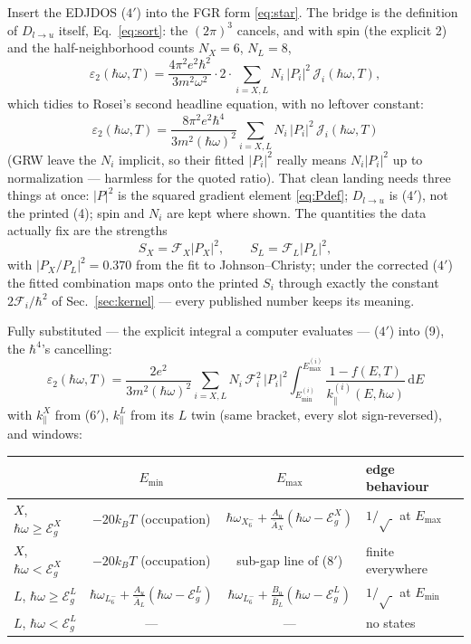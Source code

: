 \documentclass[11pt,a4paper]{article}
\numberwithin{equation}{section}
\newcommand{\hw}{\hbar\omega}
\newcommand{\EgX}{\mathcal{E}_g^{X}}
\newcommand{\EgL}{\mathcal{E}_g^{L}}
\newcommand{\cF}{\mathcal{F}}
\newcommand{\cJ}{\mathcal{J}}
\newcommand{\Ab}{\bar{A}}
\newcommand{\Bb}{\bar{B}}
\newcommand{\kpar}{k_{\parallel}}
\newcommand{\eps}{\varepsilon}
\newcommand{\dd}{\mathrm{d}}
\newcommand{\Dlu}{D_{l\to u}}
\newcommand{\wXu}{\hbar\omega_{X_6^-}}
\newcommand{\wLu}{\hbar\omega_{L_6^-}}
\newcommand{\fFD}{f}
\newcommand{\kB}{k_B}
\begin{document}
Insert the EDJDOS ($4'$) into the FGR form \eqref{eq:star}.  The
bridge is the definition of $\Dlu$ itself, Eq.~\eqref{eq:sort}: the
$(2\pi)^3$ cancels, and with spin (the explicit 2) and the
half-neighborhood counts $N_X=6$, $N_L=8$,
\begin{equation}
\eps_2(\hw,T)=\frac{4\pi^2e^2\hbar^2}{3m^2\omega^2}\cdot2\cdot
\sum_{i=X,L}N_i\,|P_i|^2\,\cJ_i(\hw,T),
\end{equation}
which tidies to Rosei's second headline equation, with no leftover
constant:
\begin{equation}
\boxed{\;
\eps_2(\hw,T)=\frac{8\pi^2e^2\hbar^4}{3m^2(\hw)^2}
\sum_{i=X,L}N_i\,|P_i|^2\,\cJ_i(\hw,T)
\;}
\tag{9}
\label{eq:eps9}
\end{equation}
(GRW leave the $N_i$ implicit, so their fitted $|P_i|^2$ really means
$N_i|P_i|^2$ up to normalization --- harmless for the quoted ratio).
That clean landing needs three things at once: $|P|^2$ is the squared
gradient element \eqref{eq:Pdef}; $\Dlu$ is ($4'$), not the printed
(4); spin and $N_i$ are kept where shown.  The quantities the data
actually fix are the strengths
\begin{equation}
S_X=\cF_X|P_X|^2,\qquad S_L=\cF_L|P_L|^2,
\tag{10}
\label{eq:S10}
\end{equation}
with $|P_X/P_L|^2=0.370$ from the fit to Johnson--Christy; under the
corrected ($4'$) the fitted combination maps onto the printed $S_i$
through exactly the constant $2\cF_i/\hbar^2$ of
Sec.~\ref{sec:kernel} --- every published number keeps its meaning.

Fully substituted --- the explicit integral a computer evaluates ---
($4'$) into (9), the $\hbar^4$'s cancelling:
\begin{equation}
\boxed{\;
\eps_2(\hw,T)=\frac{2e^{2}}{3m^{2}(\hw)^{2}}
\sum_{i=X,L}N_i\,\cF_i^{2}\,|P_i|^{2}
\int_{E_{\min}^{(i)}}^{E_{\max}^{(i)}}
\frac{1-\fFD(E,T)}{\kpar^{(i)}(E,\hw)}\,\dd E
\;}
\tag{11}
\label{eq:eps11}
\end{equation}
with $\kpar^{X}$ from ($6'$), $\kpar^{L}$ from its $L$ twin (same
bracket, every slot sign-reversed), and windows:

\begin{center}
\small
\begin{tabular}{lccl}
\toprule
 & $E_{\min}$ & $E_{\max}$ & edge behaviour\\
\midrule
$X$, $\hw\ge\EgX$ & $-20\kB T$ (occupation) &
$\wXu+\frac{A_u}{\Ab_X}(\hw-\EgX)$ & $1/\sqrt{\;}$ at $E_{\max}$\\
$X$, $\hw<\EgX$ & $-20\kB T$ (occupation) &
sub-gap line of ($8'$) & finite everywhere\\
$L$, $\hw\ge\EgL$ & $\wLu+\frac{A_u}{\Ab_L}(\hw-\EgL)$ &
$\wLu+\frac{B_u}{\Bb_L}(\hw-\EgL)$ & $1/\sqrt{\;}$ at $E_{\min}$\\
$L$, $\hw<\EgL$ & --- & --- & no states\\
\bottomrule
\end{tabular}
\end{center}
\end{document}
